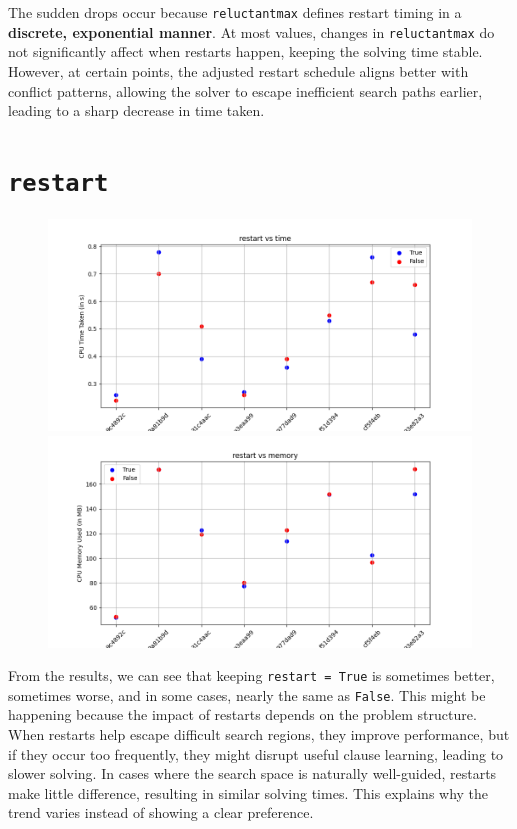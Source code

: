 \documentclass{article}
\begin{document}
    The sudden drops occur because \texttt{reluctantmax} defines restart timing
    in a \textbf{discrete, exponential manner}. At most values, changes in
    \texttt{reluctantmax} do not significantly affect when restarts happen,
    keeping the solving time stable. However, at certain points, the adjusted
    restart schedule aligns better with conflict patterns, allowing the solver
    to escape inefficient search paths earlier, leading to a sharp decrease in
    time taken.

    \section*{\texttt{restart}}
    \begin{figure}[H]
        \centering
        \begin{minipage}{\textwidth}
            \centering
            \includegraphics[width = \linewidth]{restart-0.png}
        \end{minipage}
        \hfill
        \begin{minipage}{\textwidth}
            \centering
            \includegraphics[width = \linewidth]{restart-1.png}
        \end{minipage}
    \end{figure}
    From the results, we can see that keeping \texttt{restart = True} is
    sometimes better, sometimes worse, and in some cases, nearly the same as
    \texttt{False}. This might be happening because the impact of restarts depends
    on the problem structure. When restarts help escape difficult search regions,
    they improve performance, but if they occur too frequently, they might
    disrupt useful clause learning, leading to slower solving. In cases where
    the search space is naturally well-guided, restarts make little difference,
    resulting in similar solving times. This explains why the trend varies
    instead of showing a clear preference.
\end{document}
